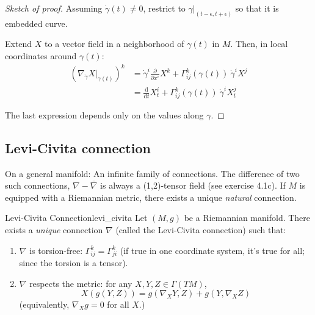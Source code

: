 \begin{proof}[Sketch of proof]

Assuming $\dot\gamma(t)\neq 0$, restrict to $\gamma|_{(t-\epsilon,t+\epsilon)}$ so that it is embedded curve.



Extend $X$ to a vector field in a neighborhood of $\gamma(t)$ in $M$. Then, in local coordinates around $\gamma(t)$:
\begin{align*}
\left(\nabla_{\dot{\gamma}} X|_{\gamma(t)}\right)^k
&= \dot{\gamma}^i \frac{\partial}{\partial x^i} X^k + \Gamma_{ij}^k(\gamma(t))\ \dot{\gamma}^i X^j \\
&= \frac{\mathrm{d}}{\mathrm{d}t} X^i_t + \Gamma_{ij}^k(\gamma(t))\ \dot{\gamma}^i X^j_t
\end{align*}


The last expression depends only on the values along $\gamma$.
\end{proof}

\subsection*{Levi-Civita connection}

On a general manifold: An infinite family of connections. The difference of two such connections, $\nabla - \overline{\nabla}$ is always a (1,2)-tensor field (see exercise 4.1c). If $M$ is equipped with a Riemannian metric, there exists a unique \emph{natural} connection.

\begin{colortheo}{Levi-Civita Connection}{levi_civita}
Let $(M, g)$ be a Riemannian manifold. There exists a \textit{unique} connection $\nabla$ (called the Levi-Civita connection) such that:
\begin{enumerate}
    \item $\nabla$ is torsion-free: $\Gamma_{ij}^k = \Gamma_{ji}^k$ (if true in one coordinate system, it's true for all; since the torsion is a tensor).
    \item $\nabla$ respects the metric: for any $X, Y, Z \in \Gamma(TM)$,
    \[
    X(g(Y, Z)) = g(\nabla_X Y, Z) + g(Y, \nabla_X Z)
    \]
    (equivalently, $\nabla_X g = 0$ for all $X$.)
\end{enumerate}
\end{colortheo}

